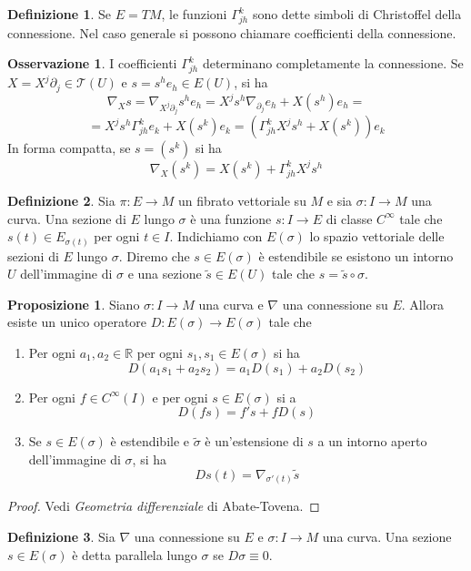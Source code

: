 \documentclass[a4paper,11pt]{article}
\theoremstyle{definition}
\newtheorem{osservazione}{Osservazione}[section]
\newtheorem{definizione}{Definizione}[section]
\theoremstyle{theorem}
\newtheorem{proposizione}{Proposizione}[section]
\newcommand{\R}{\mathbb{R}}
\newcommand{\T}{\mathcal{T}}
\begin{document}
\begin{definizione}
	Se $E=TM$, le funzioni $\Gamma^k_{jh}$ sono dette simboli di Christoffel della connessione. Nel caso generale si possono chiamare coefficienti della connessione.
\end{definizione}
\begin{osservazione}
	I coefficienti $\Gamma^k_{jh}$ determinano completamente la connessione. Se $X=X^j\partial_j\in\T(U)$ e $s=s^he_h\in E(U)$, si ha
	\[\nabla_Xs=\nabla_{X^j\partial_j}s^he_h=X^js^h\nabla_{\partial_j}e_h+X(s^h)e_h=\]\[=X^js^h\Gamma^{k}_{jh}e_k+X(s^k)e_k=\left(\Gamma^k_{jh}X^js^h+X(s^k)\right)e_k\]
	In forma compatta, se $s=\left(s^k\right)$ si ha
	\[\nabla_X\left(s^k\right)=X(s^k)+\Gamma^k_{jh}X^js^h\]
\end{osservazione}
\begin{definizione}
	Sia $\pi\colon E\to M$ un fibrato vettoriale su $M$ e sia $\sigma\colon I\to M$ una curva. Una sezione di $E$ lungo $\sigma$ è una funzione $s\colon I\to E$ di classe $C^\infty$ tale che $s(t)\in E_{\sigma(t)}$ per ogni $t\in I$. Indichiamo con $E(\sigma)$ lo spazio vettoriale delle sezioni di $E$ lungo $\sigma$. Diremo che $s\in E(\sigma)$ è estendibile se esistono un intorno $U$ dell'immagine di $\sigma$ e una sezione $\tilde{s}\in E(U)$ tale che $s=\tilde{s}\circ\sigma$.
\end{definizione}
\begin{proposizione}
	Siano $\sigma\colon I\to M$ una curva e $\nabla$ una connessione su $E$. Allora esiste un unico operatore $D\colon E(\sigma)\to E(\sigma)$ tale che
	\begin{enumerate}
		\item Per ogni $a_1,a_2\in\R$ per ogni $s_1,s_1\in E(\sigma)$ si ha
		\[D(a_1s_1+a_2s_2)=a_1D(s_1)+a_2D(s_2)\]
		\item Per ogni $f\in C^\infty(I)$ e per ogni $s\in E(\sigma)$ si a
		\[D(fs)=f's+fD(s)\]
		\item Se $s\in E(\sigma)$ è estendibile e $\tilde{\sigma}$ è un'estensione di $s$ a un intorno aperto dell'immagine di $\sigma$, si ha
		\[Ds(t)=\nabla_{\sigma'(t)}\tilde{s}\]
	\end{enumerate}
\end{proposizione}
\begin{proof}
	Vedi \textit{Geometria differenziale} di Abate-Tovena.
\end{proof}
\begin{definizione}
	Sia $\nabla$ una connessione su $E$ e $\sigma\colon I\to M$ una curva. Una sezione $s\in E(\sigma)$ è detta parallela lungo $\sigma$ se $D\sigma\equiv0$.
\end{definizione}
\end{document}
